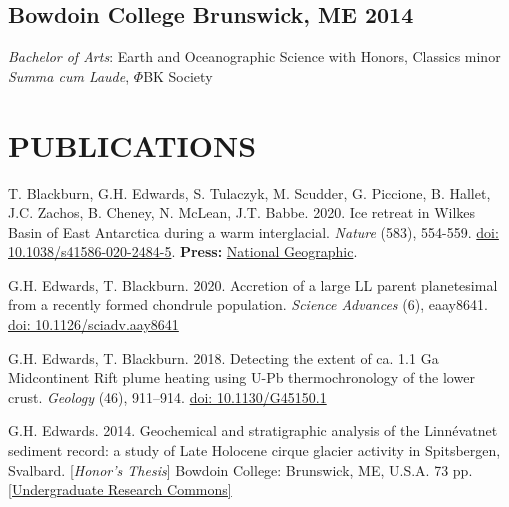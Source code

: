 \documentclass[10pt]{article}
\begin{document}
\subsection*{\textbf{Bowdoin College} \hspace{15pt} Brunswick, ME \hfill 2014}
\textit{Bachelor of Arts}: Earth and Oceanographic Science with Honors, Classics minor \\
\textit{Summa cum Laude}, $\Phi$BK Society


\section*{PUBLICATIONS}

\begin{etaremune} [itemsep=4pt, leftmargin=3ex]
  \item T. Blackburn, G.H. Edwards, S. Tulaczyk, M. Scudder, G. Piccione, B. Hallet, J.C. Zachos, B. Cheney, N. McLean, J.T. Babbe. 2020. Ice retreat in Wilkes Basin of East Antarctica during a warm interglacial. \textit{Nature} (583), 554-559. \href{https://doi.org/10.1038/s41586-020-2484-5}{doi: 10.1038/s41586-020-2484-5}. \textbf{Press:} \href{https://www.nationalgeographic.com/science/2020/07/east-antarctic-ice-sheet-more-vulnerable-to-melting-than-thought/}{National Geographic}.
  \item G.H. Edwards, T. Blackburn. 2020. Accretion of a large LL parent planetesimal from a recently formed chondrule population. \textit{Science Advances} (6), eaay8641. \href{https://advances.sciencemag.org/content/6/16/eaay8641}{doi: 10.1126/sciadv.aay8641}
  \item G.H. Edwards, T. Blackburn. 2018. Detecting the extent of ca. 1.1 Ga Midcontinent Rift plume heating using U-Pb thermochronology of the lower crust. \textit{Geology} (46), 911–914. \href{https://doi.org/10.1130/G45150.1}{doi: 10.1130/G45150.1}
  \item G.H. Edwards. 2014. Geochemical and stratigraphic analysis of the Linnévatnet sediment record: a study of Late Holocene cirque glacier activity in Spitsbergen, Svalbard. [\textit{Honor’s Thesis}] Bowdoin College: Brunswick, ME, U.S.A. 73 pp. \href{https://digitalcommons.bowdoin.edu/honorsprojects/12/}{[Undergraduate Research Commons]}
\end{etaremune}

\end{document}
